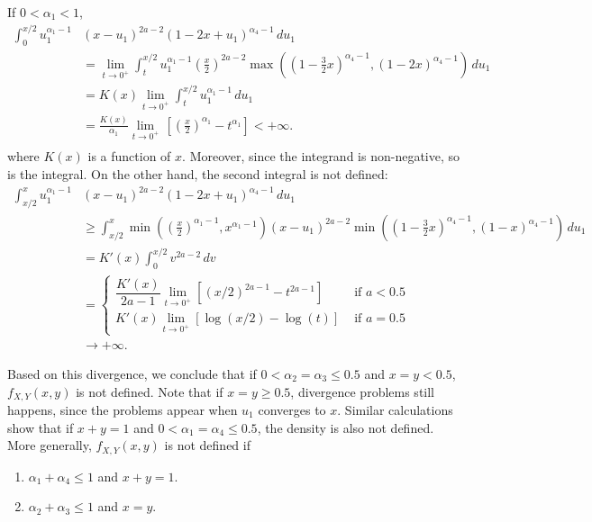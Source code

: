\documentclass[a4paper, notitlepage, 11pt]{article}
\theoremstyle{definition}
\theoremstyle{remark}
\begin{document}
If $0 < \alpha_1 < 1$, 
\begin{equation*}
  \begin{split}
    \int_{0}^{x/2} u_1^{\alpha_1-1}&(x-u_1)^{2a-2}(1-2x+u_1)^{\alpha_4-1} \, du_1 \\
    &= \lim_{t\to 0^+}\int_{t}^{x/2} u_1^{\alpha_1-1}\left(\frac{x}{2}\right)^{2a-2}\max\left(\left(1-\frac{3}{2}x\right)^{\alpha_4-1}, (1-2x)^{\alpha_4-1}\right) \, du_1 \\ 
    &= K(x)\lim_{t\to 0^+}\int_{t}^{x/2} u_1^{\alpha_1-1}\, du_1 \\ 
    &= \frac{K(x)}{\alpha_1}\lim_{t\to 0^+} \, \left[\left(\frac{x}{2}\right)^{\alpha_1} - t^{\alpha_1}\right] < +\infty .\\ 
  \end{split}
\end{equation*}
where $K(x)$ is a function of $x$. Moreover, since the integrand is non-negative, so is the integral. On the
other hand, the second integral is not defined: 
\begin{equation*}
  \begin{split}
    \int_{x/2}^{x} u_1^{\alpha_1-1}&(x-u_1)^{2a-2}(1-2x+u_1)^{\alpha_4-1} \, du_1 \\
    &\ge \int_{x/2}^x \min\left(\left(\frac{x}{2}\right)^{\alpha_1-1}, x^{\alpha_1-1}\right)(x-u_1)^{2a-2}\min\left(\left(1-\frac{3}{2}x\right)^{\alpha_4-1}, (1-x)^{\alpha_4-1}\right) \, du_1 \\
    &= K'(x) \int_{0}^{x/2} v^{2a-2} \, dv \\ 
    &= \begin{cases}
      \dfrac{K'(x)}{2a-1} \lim_{t \to 0^+} \left[(x/2)^{2a-1} - t^{2a-1}\right] &\text{ if } a < 0.5 \\ 
      K'(x) \lim_{t \to 0^+} \left[\log(x/2) - \log(t)\right] &\text{ if } a = 0.5
    \end{cases} \\
    &\to +\infty.
  \end{split}
\end{equation*}

Based on this divergence, we conclude that if $0 < \alpha_2 = \alpha_3 \le 0.5$
and $x = y < 0.5$, $f_{X,Y}(x,y)$ is not defined. Note that if $x = y \ge
0.5$, divergence problems still happens, since the problems appear when $u_1$
converges to $x$. Similar calculations show
that if $x + y = 1$ and $0 < \alpha_1 = \alpha_4 \le 0.5$, the density is also
not defined. More generally, $f_{X,Y}(x,y)$ is not defined if 

\begin{enumerate}
  \item $\alpha_1 + \alpha_4 \le 1$ and $x + y = 1$. 
  \item $\alpha_2 + \alpha_3 \le 1$ and $x = y$. 
\end{enumerate}
\end{document}
